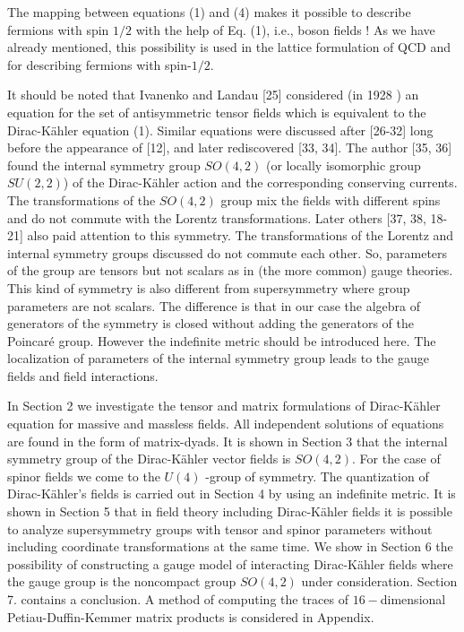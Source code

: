 \documentclass[a4paper,12pt]{article}
\begin{document}
The mapping between equations (1) and (4) makes it possible to describe
fermions with spin $1/2$ with the help of Eq. (1), i.e., boson fields ! As
we have already mentioned, this possibility is used in the lattice
formulation of QCD and for describing fermions with spin-$1/2$.

It should be noted that Ivanenko and Landau [25] considered (in 1928 ) an
equation for the set of antisymmetric tensor fields which is equivalent to
the Dirac-K\"ahler equation (1). Similar equations were discussed after
[26-32] long before the appearance of [12], and later rediscovered [33, 34].
The author [35, 36] found the internal symmetry group $SO(4,2)$ (or locally
isomorphic group $SU(2,2)$) of the Dirac-K\"ahler action and the
corresponding conserving currents. The transformations of the $SO(4,2)$
group mix the fields with different spins and do not commute with the
Lorentz transformations. Later others [37, 38, 18-21] also paid attention to
this symmetry. The transformations of the Lorentz and internal symmetry
groups discussed do not commute each other. So, parameters of the group are
tensors but not scalars as in (the more common) gauge theories. This kind of
symmetry is also different from supersymmetry where group parameters are not
scalars. The difference is that in our case the algebra of generators of the
symmetry is closed without adding the generators of the Poincar\'e group.
However the indefinite metric should be introduced here. The localization of
parameters of the internal symmetry group leads to the gauge fields and
field interactions.

In Section 2 we investigate the tensor and matrix formulations of
Dirac-K\"ahler equation for massive and massless fields. All
independent solutions of equations are found in the form of
matrix-dyads. It is shown in Section 3 that the internal symmetry
group of the Dirac-K\"ahler vector fields is $SO(4,2)$. For the
case of spinor fields we come to the $U(4)$ -group of symmetry.
The quantization of Dirac-K\"ahler's fields is carried out in
Section 4 by using an indefinite metric. It is shown in Section 5
that in field theory including Dirac-K\"ahler fields it is
possible to analyze supersymmetry groups with tensor and spinor
parameters without including coordinate transformations at the
same time. We show in Section 6 the possibility of constructing a
gauge model of interacting Dirac-K\"ahler fields where the gauge
group is the noncompact group $SO(4,2)$ under consideration.
Section 7. contains a conclusion. A method of computing the traces
of $16-$dimensional Petiau-Duffin-Kemmer matrix products is
considered in Appendix.
\end{document}
